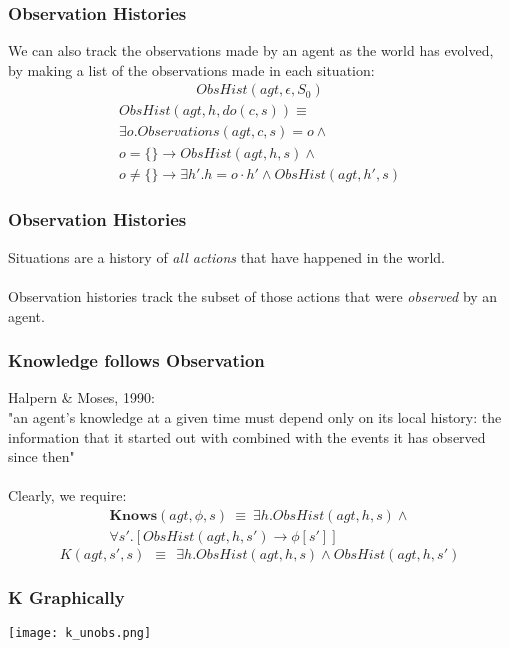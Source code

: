 \documentclass{beamer}
\begin{document}
\begin{frame}
\frametitle{Observation Histories}
We can also track the observations made by an agent as the world has evolved,
by making a list of the observations made in each situation:
\begin{multline*}
ObsHist(agt,\epsilon,S_0)
\end{multline*}
\begin{multline*}
ObsHist(agt,h,do(c,s)) \equiv \\
    \exists o . Observations(agt,c,s) = o \wedge \\
    o = \{\} \rightarrow ObsHist(agt,h,s) \wedge \\
    o \not = \{\} \rightarrow \exists h' . h=o\cdot h' \wedge ObsHist(agt,h',s)
\end{multline*}
\end{frame}

\begin{frame}
\frametitle{Observation Histories}
Situations are a history of \emph{all actions} that have happened in the world.
\ \\
\ \\
Observation histories track the subset of those actions that were
\emph{observed} by an agent.
\end{frame}

\begin{frame}
\frametitle{Knowledge follows  Observation}
Halpern \& Moses, 1990:\\
"an agent's knowledge at a given time must depend only on its local history:
the information that it started out with combined with the events it has
observed since then"
\pause
\ \\
\ \\
Clearly, we require:
\begin{multline*}
\mathbf{Knows}(agt,\phi,s)\ \equiv\ \exists h . ObsHist(agt,h,s) \wedge \\
    \forall s' . \left[ObsHist(agt,h,s') \rightarrow \phi[s']\right]
\end{multline*}
\pause
\begin{equation*}
K(agt,s',s)\ \ \equiv\ \ \exists h . ObsHist(agt,h,s) \wedge ObsHist(agt,h,s')
\end{equation*}
\end{frame}

\begin{frame}
\frametitle{K Graphically}
\begin{center}
  \texttt{[image: k\_unobs.png]}
\end{center}
\end{frame}
\end{document}
